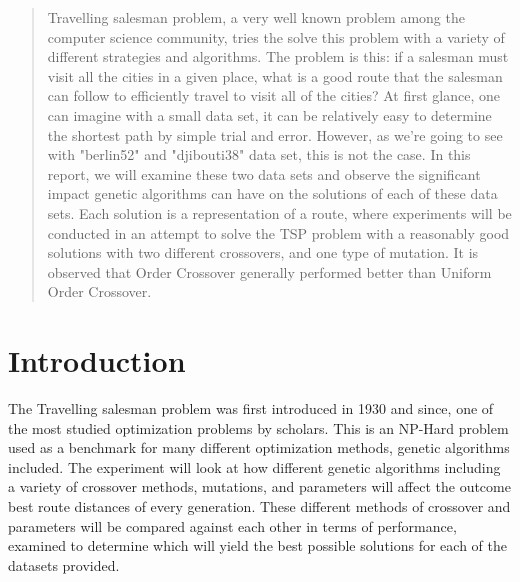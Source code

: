 \documentclass[conference]{IEEEtran}
\begin{document}
\maketitle

\begin{abstract}
Travelling salesman problem, a very well known problem among the computer science community, tries the solve this problem with a variety of different strategies and algorithms. The problem is this: if a salesman must visit all the cities in a given place, what is a good route that the salesman can follow to efficiently travel to visit all of the cities? At first glance, one can imagine with a small data set, it can be relatively easy to determine the shortest path by simple trial and error. However, as we're going to see with "berlin52" and "djibouti38" data set, this is not the case. In this report, we will examine these two data sets and observe the significant impact genetic algorithms can have on the solutions of each of these data sets. Each solution is a representation of a route, where experiments will be conducted in an attempt to solve the TSP problem with a reasonably good solutions with two different crossovers, and one type of mutation. It is observed that Order Crossover generally performed better than Uniform Order Crossover.
\end{abstract}





%
\IEEEpeerreviewmaketitle



\section{Introduction}
The Travelling salesman problem was first introduced in 1930 and since, one of the most studied optimization problems by scholars. This is an NP-Hard problem used as a benchmark for many different optimization methods, genetic algorithms included. The experiment will look at how different genetic algorithms including a variety of crossover methods, mutations, and parameters will affect the outcome best route distances of every generation. These different methods of crossover and parameters will be compared against each other in terms of performance, examined to determine which will yield the best possible solutions for each of the datasets provided. 
\end{document}
